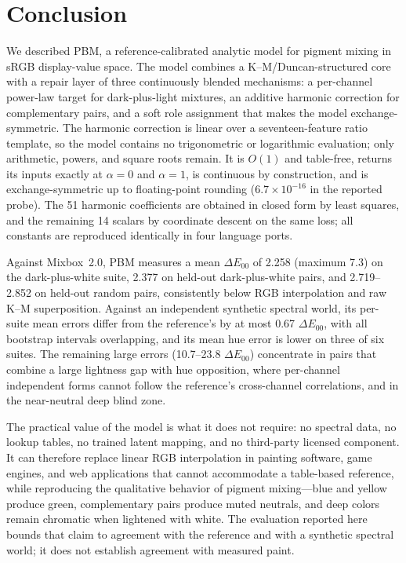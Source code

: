 \section{Conclusion}
\label{sec:conclusion}

We described PBM, a reference-calibrated analytic model for pigment mixing in sRGB display-value space. The model combines a K--M/Duncan-structured core with a repair layer of three continuously blended mechanisms: a per-channel power-law target for dark-plus-light mixtures, an additive harmonic correction for complementary pairs, and a soft role assignment that makes the model exchange-symmetric. The harmonic correction is linear over a seventeen-feature ratio template, so the model contains no trigonometric or logarithmic evaluation; only arithmetic, powers, and square roots remain. It is $O(1)$ and table-free, returns its inputs exactly at $\alpha=0$ and $\alpha=1$, is continuous by construction, and is exchange-symmetric up to floating-point rounding ($6.7\times10^{-16}$ in the reported probe). The 51 harmonic coefficients are obtained in closed form by least squares, and the remaining 14 scalars by coordinate descent on the same loss; all constants are reproduced identically in four language ports.

Against Mixbox~2.0, PBM measures a mean $\Delta E_{00}$ of 2.258 (maximum 7.3) on the dark-plus-white suite, 2.377 on held-out dark-plus-white pairs, and 2.719--2.852 on held-out random pairs, consistently below RGB interpolation and raw K--M superposition. Against an independent synthetic spectral world, its per-suite mean errors differ from the reference's by at most 0.67 $\Delta E_{00}$, with all bootstrap intervals overlapping, and its mean hue error is lower on three of six suites. The remaining large errors (10.7--23.8 $\Delta E_{00}$) concentrate in pairs that combine a large lightness gap with hue opposition, where per-channel independent forms cannot follow the reference's cross-channel correlations, and in the near-neutral deep blind zone.

The practical value of the model is what it does not require: no spectral data, no lookup tables, no trained latent mapping, and no third-party licensed component. It can therefore replace linear RGB interpolation in painting software, game engines, and web applications that cannot accommodate a table-based reference, while reproducing the qualitative behavior of pigment mixing---blue and yellow produce green, complementary pairs produce muted neutrals, and deep colors remain chromatic when lightened with white. The evaluation reported here bounds that claim to agreement with the reference and with a synthetic spectral world; it does not establish agreement with measured paint.
